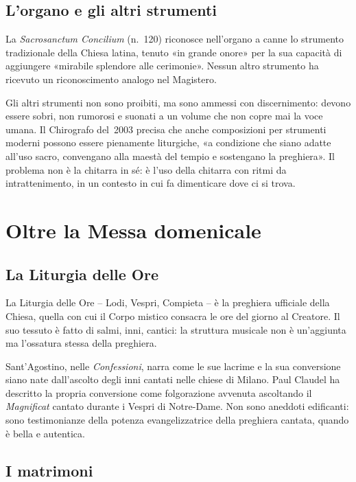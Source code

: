 \documentclass[12pt,a4paper]{article}
\begin{document}
	\subsection{L'organo e gli altri strumenti}
	
	La \emph{Sacrosanctum Concilium} (n.~120) riconosce nell'organo a canne lo
	strumento tradizionale della Chiesa latina, tenuto «in grande onore» per la sua
	capacità di aggiungere «mirabile splendore alle cerimonie». Nessun altro
	strumento ha ricevuto un riconoscimento analogo nel Magistero.
	
	Gli altri strumenti non sono proibiti, ma sono ammessi con discernimento: devono
	essere sobri, non rumorosi e suonati a un volume che non copre mai la voce
	umana. Il Chirografo del~2003 precisa che anche composizioni per strumenti
	moderni possono essere pienamente liturgiche, «a condizione che siano adatte
	all'uso sacro, convengano alla maestà del tempio e sostengano la preghiera». Il
	problema non è la chitarra in sé: è l'uso della chitarra con ritmi da
	intrattenimento, in un contesto in cui fa dimenticare dove ci si trova.
	
	\section{Oltre la Messa domenicale}
	
	\subsection{La Liturgia delle Ore}
	
	La Liturgia delle Ore -- Lodi, Vespri, Compieta -- è la preghiera ufficiale
	della Chiesa, quella con cui il Corpo mistico consacra le ore del giorno al
	Creatore. Il suo tessuto è fatto di salmi, inni, cantici: la struttura musicale
	non è un'aggiunta ma l'ossatura stessa della preghiera.
	
	Sant'Agostino, nelle \emph{Confessioni}, narra come le sue lacrime e la sua
	conversione siano nate dall'ascolto degli inni cantati nelle chiese di Milano.
	Paul Claudel ha descritto la propria conversione come folgorazione avvenuta
	ascoltando il \emph{Magnificat} cantato durante i Vespri di Notre-Dame. Non sono
	aneddoti edificanti: sono testimonianze della potenza evangelizzatrice della
	preghiera cantata, quando è bella e autentica.
	
	\subsection{I matrimoni}
	
\end{document}
